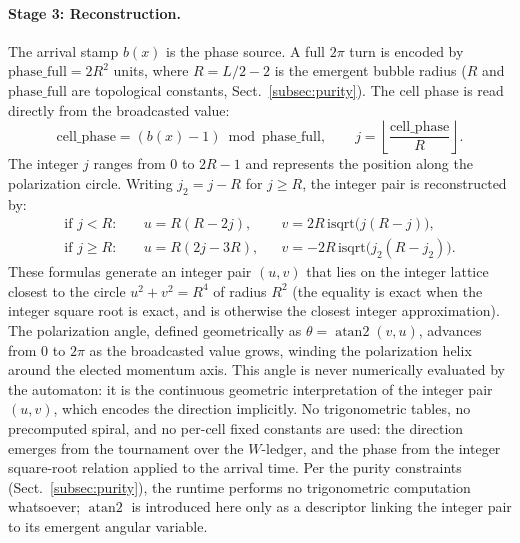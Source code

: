 \documentclass[a4paper]{article}
\begin{document}
\paragraph{Stage 3: Reconstruction.}  The arrival stamp $b(x)$ is the phase source.  A full $2\pi$ turn is encoded by $\mathrm{phase\_full}=2R^{2}$ units, where $R=L/2-2$ is the emergent bubble radius ($R$ and $\mathrm{phase\_full}$ are topological constants, Sect.~\ref{subsec:purity}).  The cell phase is read directly from the broadcasted value:
\[
\mathrm{cell\_phase}=(b(x)-1)\bmod\mathrm{phase\_full}, \qquad j=\left\lfloor\frac{\mathrm{cell\_phase}}{R}\right\rfloor .
\]
The integer $j$ ranges from $0$ to $2R-1$ and represents the position along the polarization circle.  Writing $j_{2}=j-R$ for $j\ge R$, the integer pair is reconstructed by:
\begin{align}
\text{if }j<R:\quad&u=R(R-2j),          &&v=2R\,\mathrm{isqrt}\bigl(j(R-j)\bigr),\label{eq:polu}\\
\text{if }j\ge R:\quad&u=R(2j-3R),       &&v=-2R\,\mathrm{isqrt}\bigl(j_{2}(R-j_{2})\bigr).\label{eq:polv}
\end{align}
These formulas generate an integer pair $(u,v)$ that lies on the integer lattice closest to the circle $u^{2}+v^{2}=R^{4}$ of radius $R^{2}$ (the equality is exact when the integer square root is exact, and is otherwise the closest integer approximation).  The polarization angle, defined geometrically as $\theta=\operatorname{atan2}(v,u)$, advances from $0$ to $2\pi$ as the broadcasted value grows, winding the polarization helix around the elected momentum axis.  This angle is never numerically evaluated by the automaton: it is the continuous geometric interpretation of the integer pair $(u,v)$, which encodes the direction implicitly.  No trigonometric tables, no precomputed spiral, and no per-cell fixed constants are used: the direction emerges from the tournament over the $W$-ledger, and the phase from the integer square-root relation applied to the arrival time.  Per the purity constraints (Sect.~\ref{subsec:purity}), the runtime performs no trigonometric computation whatsoever; $\operatorname{atan2}$ is introduced here only as a descriptor linking the integer pair to its emergent angular variable.
\end{document}
